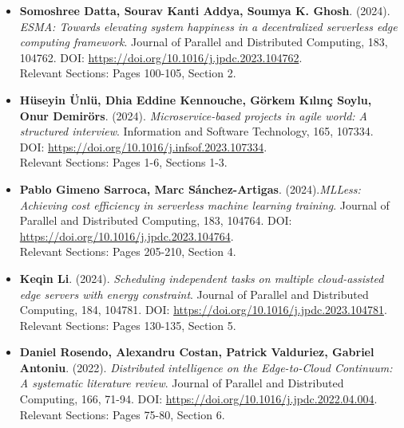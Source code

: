 \documentclass[a4paper, 12pt]{article}
\begin{document}
\begin{itemize}
    \item \textbf{Somoshree Datta, Sourav Kanti Addya, Soumya K. Ghosh}. (2024). \textit{ESMA: Towards elevating system happiness in a decentralized serverless edge computing framework}. Journal of Parallel and Distributed Computing, 183, 104762. DOI: \href{https://doi.org/10.1016/j.jpdc.2023.104762}{https://doi.org/10.1016/j.jpdc.2023.104762}. \\ Relevant Sections: Pages 100-105, Section 2.

\item \textbf{Hüseyin Ünlü, Dhia Eddine Kennouche, Görkem Kılınç Soylu, Onur Demirörs}. (2024). \textit{Microservice-based projects in agile world: A structured interview}. Information and Software Technology, 165, 107334. \\DOI: \href{https://doi.org/10.1016/j.infsof.2023.107334}{https://doi.org/10.1016/j.infsof.2023.107334}. \\ Relevant Sections: Pages 1-6, Sections 1-3.


    \item \textbf{Pablo Gimeno Sarroca, Marc Sánchez-Artigas}. (2024).\textit{MLLess: Achieving cost efficiency in serverless machine learning training}. Journal of Parallel and Distributed Computing, 183, 104764. DOI: \href{https://doi.org/10.1016/j.jpdc.2023.104764}{https://doi.org/10.1016/j.jpdc.2023.104764}. \\ Relevant Sections: Pages 205-210, Section 4.

    \item \textbf{Keqin Li}. (2024). \textit{Scheduling independent tasks on multiple cloud-assisted edge servers with energy constraint}. Journal of Parallel and Distributed Computing, 184, 104781. DOI: \href{https://doi.org/10.1016/j.jpdc.2023.104781}{https://doi.org/10.1016/j.jpdc.2023.104781}. \\ Relevant Sections: Pages 130-135, Section 5.

    \item \textbf{Daniel Rosendo, Alexandru Costan, Patrick Valduriez, Gabriel Antoniu}. (2022). \textit{Distributed intelligence on the Edge-to-Cloud Continuum: A systematic literature review}. Journal of Parallel and Distributed Computing, 166, 71-94. DOI: \href{https://doi.org/10.1016/j.jpdc.2022.04.004}{https://doi.org/10.1016/j.jpdc.2022.04.004}. \\ Relevant Sections: Pages 75-80, Section 6.
\end{itemize}


\newpage


\end{document}
